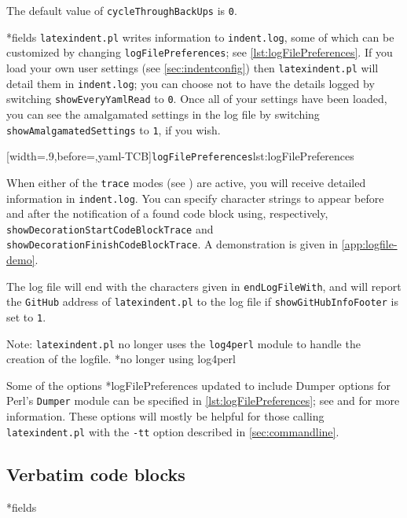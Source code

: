  The default value of \texttt{cycleThroughBackUps} is \texttt{0}.

*{fields}
 \texttt{latexindent.pl} writes information to \texttt{indent.log}, some
 of which can be customized by changing \texttt{logFilePreferences}; see
 \cref{lst:logFilePreferences}. If you load your own user settings (see
 \vref{sec:indentconfig}) then \texttt{latexindent.pl} will detail them in
 \texttt{indent.log}; you can choose not to have the details logged by switching
 \texttt{showEveryYamlRead} to \texttt{0}. Once all of your settings have been loaded, you
 can see the amalgamated settings in the log file by switching
 \texttt{showAmalgamatedSettings} to \texttt{1}, if you wish.

 [width=.9\linewidth,before=\centering,yaml-TCB]{\texttt{logFilePreferences}}{lst:logFilePreferences}

 When 
 either of the \texttt{trace} modes (see ) are active, you
 will receive detailed information in \texttt{indent.log}. You can specify character
 strings to appear before and after the notification of a found code block using,
 respectively, \texttt{showDecorationStartCodeBlockTrace} and
 \texttt{showDecorationFinishCodeBlockTrace}. A demonstration is given in
 \vref{app:logfile-demo}.%

 The log file will end with the characters given in \texttt{endLogFileWith}, and will
 report the \texttt{GitHub} address of \texttt{latexindent.pl} to the log file if
 \texttt{showGitHubInfoFooter} is set to \texttt{1}.

 Note: \texttt{latexindent.pl} no longer uses the \texttt{log4perl} module to handle the
 creation of the logfile. *{no longer using log4perl}%

 Some of the options *{logFilePreferences updated to include Dumper
 options} for Perl's \texttt{Dumper} module can be specified in
 \cref{lst:logFilePreferences}; see \cite{dumper} and \cite{dumperdemo} for more
 information. These options will mostly be helpful for those calling
 \texttt{latexindent.pl} with the \texttt{-tt} option described in
 \cref{sec:commandline}.%

\subsection{Verbatim code blocks}
*{fields}

